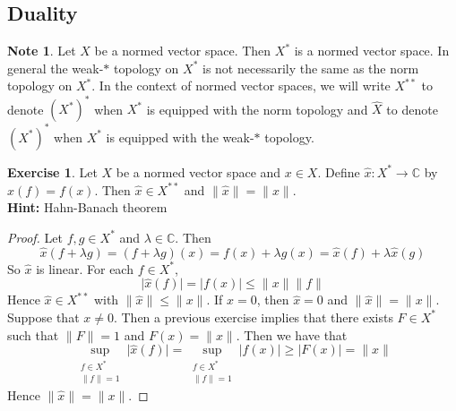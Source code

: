 \documentclass[12pt]{amsart}
\theoremstyle{definition}
\newtheorem{note}[definition]{Note}
\newtheorem{ex}[definition]{Exercise}
\newcommand{\lam}{\lambda}
\newcommand{\C}{\mathbb{C}}
\newcommand{\tbf}[1]{\textbf{#1}}
\DeclareMathOperator*{\0}{\mbf{0}}
\DeclareMathOperator*{\1}{\mbf{1}}
\newcommand{\lex}[1]{\label{ex:#1}}
\begin{document}
	



























	\newpage
	\subsection{Duality}

	\begin{note}
		Let $X$ be a normed vector space. Then $X^*$ is a normed vector space. In general the weak-$*$ topology on $X^*$ is not necessarily the same as the norm topology on $X^*$. In the context of normed vector spaces, we will write $X^{**}$ to denote $(X^*)^*$ when $X^*$ is equipped with the norm topology and $\hat{X}$ to denote $(X^*)^*$ when $X^*$ is equipped with the weak-$*$ topology. 
	\end{note}
	
	\begin{ex} \lex{}
		Let $X$ be a normed vector space and $x \in X$. Define $\hat{x}:X^* \rightarrow \C$ by $\hat{x}(f) = f(x)$. Then $\hat{x} \in X^{**}$ and $\|\hat{x} \|= \|x \|$. \\
		\tbf{Hint:} Hahn-Banach theorem
	\end{ex}
	
	\begin{proof}
		Let $f,g \in X^*$ and $\lam \in \C$. Then $$\hat{x}(f+\lam g) = (f+ \lam g)(x) = f(x) + \lam g(x) = \hat{x}(f) + \lam \hat{x}(g)$$
		So $\hat{x}$ is linear. For each $f \in X^*$, $$\vert \hat{x}(f) \vert = \vert f(x) \vert \leq \|x \|\|f \|$$ Hence $\hat{x} \in X^{**}$ with $\|\hat{x} \|\leq \|x \|$. If $x=0$, then $\hat{x} = 0$ and $\|\hat{x} \|= \|x \|$. Suppose that $x \neq 0$. Then a previous exercise implies that there exists $F \in X^*$ such that $\|F \|=1$ and $F(x) = \|x \|$. Then we have that $$\sup_{\substack{f \in X^* \\ \|f \|= 1 } } \vert \hat{x}(f) \vert  = \sup_{\substack{f \in X^* \\ \|f \|= 1 }}  \vert f(x) \vert \geq \vert F(x) \vert = \|x \|$$
		Hence $\|\hat{x} \|= \|x \|$.
	\end{proof}
\end{document}
